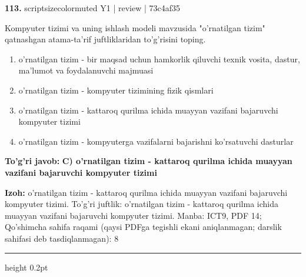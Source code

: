 \documentclass[10pt,a4paper]{article}
\begin{document}
{\bfseries\sffamily\color{ink} 113.} {scriptsizecolor{muted} Y1 | review | 73c4af35}
\par
Kompyuter tizimi va uning ishlash modeli mavzusida "o'rnatilgan tizim" qatnashgan atama-ta'rif juftliklaridan to'g'risini toping.
\begin{enumerate}[label=\Alph*),leftmargin=9mm]
\item o'rnatilgan tizim - bir maqsad uchun hamkorlik qiluvchi texnik vosita, dastur, ma'lumot va foydalanuvchi majmuasi
\item o'rnatilgan tizim - kompyuter tizimining fizik qismlari
\item o'rnatilgan tizim - kattaroq qurilma ichida muayyan vazifani bajaruvchi kompyuter tizimi
\item o'rnatilgan tizim - kompyuterga vazifalarni bajarishni ko'rsatuvchi dasturlar
\end{enumerate}
\begin{tcolorbox}[enhanced,breakable,colback=teal!4,colframe=teal!60!black,boxrule=0.45pt,arc=1.2mm,left=2.7mm,right=2.7mm,top=1.8mm,bottom=1.8mm,before skip=2mm,after skip=2mm]
{\bfseries\sffamily\color{teal}To'g'ri javob:} \textbf{C) o'rnatilgan tizim - kattaroq qurilma ichida muayyan vazifani bajaruvchi kompyuter tizimi}
\par\smallskip
{\bfseries Izoh:} o'rnatilgan tizim - kattaroq qurilma ichida muayyan vazifani bajaruvchi kompyuter tizimi. To'g'ri juftlik: o'rnatilgan tizim - kattaroq qurilma ichida muayyan vazifani bajaruvchi kompyuter tizimi. Manba: ICT9, PDF 14; Qo'shimcha sahifa raqami (qaysi PDFga tegishli ekani aniqlanmagan; darslik sahifasi deb tasdiqlanmagan): 8
\end{tcolorbox}
\vspace{2mm}\hrule height 0.2pt\vspace{3mm}
\end{document}
